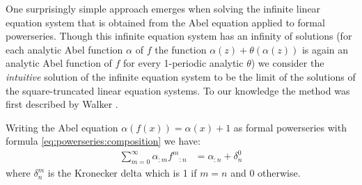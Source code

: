 \documentclass{article}
\numberwithin{equation}{section}
\begin{document}



One surprisingly simple approach emerges when solving the infinite
linear equation system that is obtained from the Abel equation applied to
formal powerseries. Though this infinite equation system has an infinity of
solutions (for each analytic Abel function $\alpha$ of $f$ the function
$\alpha(z)+\theta(\alpha(z))$ is again an analytic Abel function of $f$ for
every 1-periodic analytic $\theta$) we consider the {\em intuitive} solution of
the infinite equation system to be the limit of the solutions of the
square-truncated linear equation systems. To our knowledge the method was
first described by Walker \cite{walker:solutions}.

Writing the Abel equation $\alpha(f(x))=\alpha(x)+1$ as formal powerseries
with formula \eqref{eq:powerseries:composition} we have:
\begin{align*}
  \sum_{m=0}^\infty \alpha_{:m} {f^m}_{:n} &= \alpha_{:n} + \delta^0_n
\end{align*}
where $\delta^m_n$ is the Kronecker delta which is 1 if $m=n$ and 0 otherwise.
\end{document}
